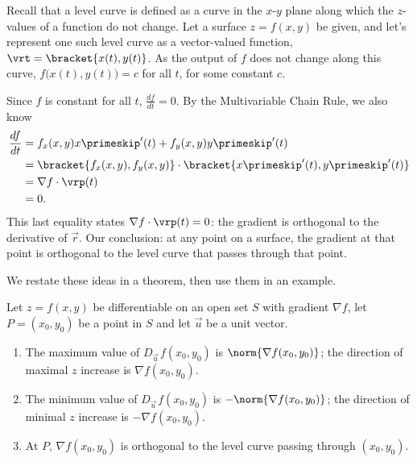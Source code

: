 Recall that a level curve is defined as a curve in the $x$-$y$ plane along which the $z$-values of a function do not change. Let a surface $z=f(x,y)$ be given, and let's represent one such level curve as a vector-valued function, $\vrt =\bracket{x(t), y(t)}$. As the output of $f$ does not change along this curve, $f\bigl(x(t),y(t)\bigr) = c$ for all $t$, for some constant $c$.

Since $f$ is constant for all $t$, $\frac{df}{dt} = 0$. By the Multivariable Chain Rule, we also know
\begin{align*}
\frac{df}{dt} &= f_x(x,y)x\primeskip'(t) + f_y(x,y)y\primeskip'(t)\\
	&=\bracket{f_x(x,y),f_y(x,y)}\cdot\bracket{x\primeskip'(t),y\primeskip'(t)}\\
						&= \nabla f \cdot \vrp(t)\\
						&=0.
\end{align*}
This last equality states $\nabla f \cdot \vrp(t) = 0$: the gradient is orthogonal to the derivative of $\vec r$. Our conclusion: at any point on a surface, the gradient at that point is orthogonal to the level curve that passes through that point.

We restate these ideas in a theorem, then use them in an example.

\begin{theorem}\label{thm:gradient}
Let $z=f(x,y)$ be differentiable on an open set $S$ with gradient $\nabla f$, let $P=(x_0,y_0)$ be a point in $S$ and let $\vec u$ be a unit vector.
\begin{enumerate}
	\item The maximum value of $D_{\vec u\,}f(x_0,y_0)$ is $\norm{\nabla f(x_0,y_0)}$; the direction of maximal $z$ increase is $\nabla f(x_0,y_0)$.
	\item   The minimum value of $D_{\vec u\,}f(x_0,y_0)$ is $-\norm{\nabla f(x_0,y_0)}$; the direction of minimal $z$ increase is $-\nabla f(x_0,y_0)$.
	\item At $P$, $\nabla f(x_0,y_0)$ is orthogonal to the level curve passing through $(x_0,y_0)$.
\end{enumerate}
\end{theorem}

